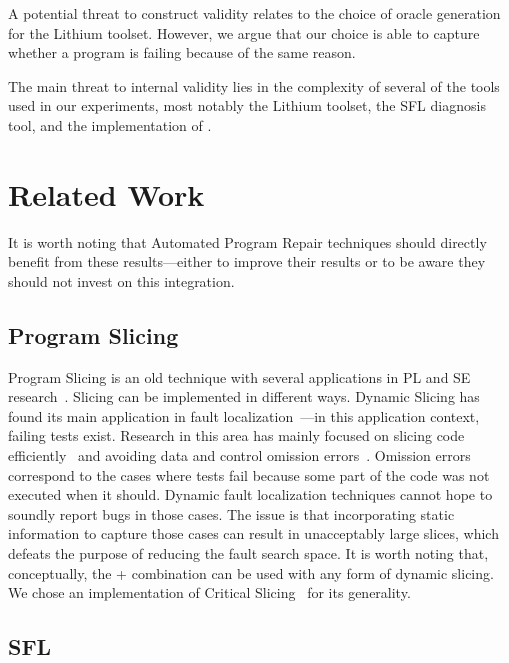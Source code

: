 \documentclass{article}
\begin{document}
A potential threat to construct validity relates to the choice of oracle generation
for the Lithium toolset. However, we argue that our choice is able to capture whether
a program is failing because of the same reason.

The main threat to internal validity lies in the complexity of several of the tools
used in our experiments, most notably the Lithium toolset, the SFL diagnosis tool,
and the implementation of \comb{}.
%
\section{Related Work}

 It is worth noting that Automated
Program Repair techniques should directly benefit from these
results---either to improve their results or to be aware they should
not invest on this integration.

\subsection{Program Slicing}

Program Slicing is an old technique with several applications in PL
and SE research~\cite{Weiser:1981:PS:800078.802557}. Slicing can be
implemented in different ways. Dynamic Slicing has found its main
application in fault
localization~\cite{Agrawal:1990:DPS:93542.93576}---in this application
context, failing tests exist. Research in this area has mainly focused
on slicing code
efficiently~\cite{Wang:2008:DSJ:1330017.1330021,Wang:2004:UCB:998675.999455}
and avoiding data and control omission
errors~\cite{Zhang:2007:TLE:1250734.1250782,Lin:2018:BDE:3238147.3238163}. Omission errors correspond to the
cases where tests fail because some part of the code was not executed
when it should. Dynamic fault localization techniques cannot hope to
soundly report bugs in those cases. The issue is that incorporating
static information to capture those cases can result in unacceptably
large slices, which defeats the purpose of reducing the fault search
space. It is worth noting that, conceptually, the \sfl{}+\ds{} combination
can be used with any form of dynamic slicing. We chose an
implementation of Critical
Slicing~\cite{DeMillo:1996:CSS:229000.226310} for its generality.



\subsection{SFL}
\end{document}

